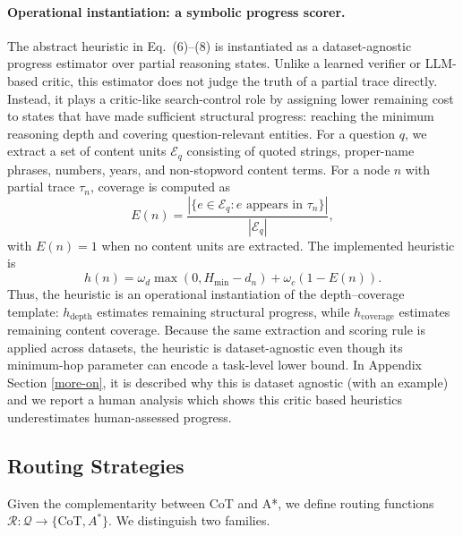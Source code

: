 \documentclass[11pt]{article}
\begin{document}
\paragraph{Operational instantiation: a symbolic progress scorer.}
The abstract heuristic in Eq.~(6)--(8) is instantiated as a
dataset-agnostic progress estimator over partial reasoning states. Unlike
a learned verifier or LLM-based critic, this estimator does not judge the
truth of a partial trace directly. Instead, it plays a critic-like
search-control role by assigning lower remaining cost to states that have
made sufficient structural progress: reaching the minimum reasoning depth
and covering question-relevant entities. For a question \(q\), we extract
a set of content units \(\mathcal{E}_q\) consisting of quoted strings,
proper-name phrases, numbers, years, and non-stopword content terms. For
a node \(n\) with partial trace \(\tau_n\), coverage is computed as
\[
E(n)=
\frac{|\{e\in\mathcal{E}_q: e \text{ appears in } \tau_n\}|}
{|\mathcal{E}_q|},
\]
with \(E(n)=1\) when no content units are extracted. The implemented
heuristic is
\[
h(n)
=
\omega_d\max(0,H_{\min}-d_n)
+
\omega_c(1-E(n)).
\]
Thus, the heuristic is an operational instantiation of the
depth--coverage template: \(h_{\mathrm{depth}}\) estimates remaining
structural progress, while \(h_{\mathrm{coverage}}\) estimates remaining
content coverage. Because the same extraction and scoring rule is applied
across datasets, the heuristic is dataset-agnostic even though its
minimum-hop parameter can encode a task-level lower bound. In Appendix Section \ref{more-on}, it is described why this is dataset agnostic (with an example) and we report a human analysis which shows this critic based heuristics underestimates human-assessed progress.





\subsection{Routing Strategies}
\label{sec:routing}

Given the complementarity between CoT and A*, we define routing functions $\mathcal{R}: \mathcal{Q} \to \{\text{CoT}, A^*\}$. We distinguish two families.
\end{document}
